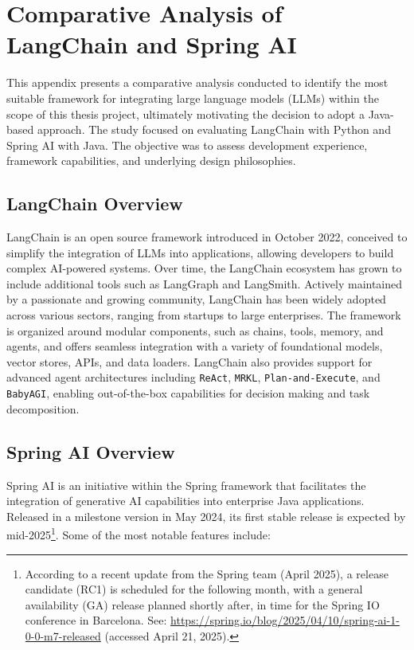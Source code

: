 \chapter{Comparative Analysis of LangChain and Spring AI
} \label{ch:appendix_spring}

This appendix presents a comparative analysis conducted to identify the most suitable framework for integrating large language models (LLMs) within the scope of this thesis project, ultimately motivating the decision to adopt a Java-based approach. The study focused on evaluating LangChain with Python and Spring AI with Java. The objective was to assess development experience, framework capabilities, and underlying design philosophies.



\section*{LangChain Overview}

LangChain is an open source framework introduced in October 2022, conceived to simplify the integration of LLMs into applications, allowing developers to build complex AI-powered systems. Over time, the LangChain ecosystem has grown to include additional tools such as LangGraph and LangSmith. Actively maintained by a passionate and growing community, LangChain has been widely adopted across various sectors, ranging from startups to large enterprises.
The framework is organized around modular components, such as chains, tools, memory, and agents, and offers seamless integration with a variety of foundational models, vector stores, APIs, and data loaders. LangChain also provides support for advanced agent architectures including \texttt{ReAct}, \texttt{MRKL}, \texttt{Plan-and-Execute}, and \texttt{BabyAGI}, enabling out-of-the-box capabilities for decision making and task decomposition.




\section*{Spring AI Overview}
Spring AI is an initiative within the Spring framework that facilitates the integration of generative AI capabilities into enterprise Java applications. Released in a milestone version in May 2024, its first stable release is expected by mid-2025\footnote{According to a recent update from the Spring team (April 2025), a release candidate (RC1) is scheduled for the following month, with a general availability (GA) release planned shortly after, in time for the Spring IO conference in Barcelona. See: \url{https://spring.io/blog/2025/04/10/spring-ai-1-0-0-m7-released} (accessed April 21, 2025).}. Some of the most notable features include:

